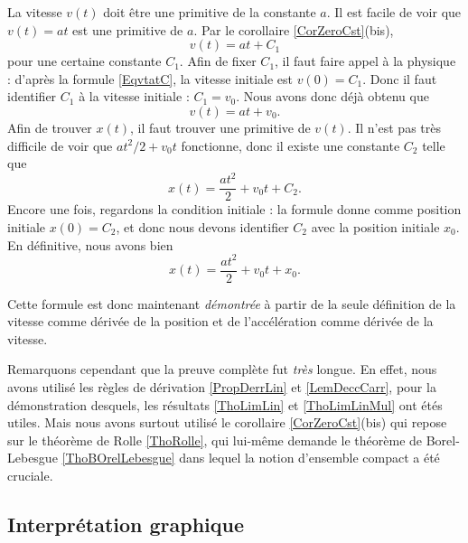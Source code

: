 La vitesse $v(t)$ doit être une primitive de la constante $a$. Il est facile de voir que $v(t)=at$ est une primitive de $a$. Par le corollaire \ref{CorZeroCst}(bis),
\begin{equation}    \label{EqvtatC}
    v(t)=at+C_1
\end{equation}
pour une certaine constante $C_1$. Afin de fixer $C_1$, il faut faire appel à la physique : d'après la formule \eqref{EqvtatC}, la vitesse initiale est $v(0)=C_1$. Donc il faut identifier $C_1$ à la vitesse initiale : $C_1=v_0$. Nous avons donc déjà obtenu que
\begin{equation}
    v(t)=at+v_0.
\end{equation}
Afin de trouver $x(t)$, il faut trouver une primitive de $v(t)$. Il n'est pas très difficile de voir que $at^2/2 + v_0t$ fonctionne, donc il existe une constante $C_2$ telle que
\begin{equation}
    x(t)=\frac{ at^2 }{ 2 }+v_0t+C_2.
\end{equation}
Encore une fois, regardons la condition initiale : la formule donne comme position initiale $x(0)=C_2$, et donc nous devons identifier $C_2$ avec la position initiale $x_0$. En définitive, nous avons bien
\begin{equation}
    x(t) = \frac{ at^2 }{ 2 } + v_0t +x_0.
\end{equation}

Cette formule est donc maintenant \emph{démontrée} à partir de la seule définition de la vitesse comme dérivée de la position et de l'accélération comme dérivée de la vitesse. 

Remarquons cependant que la preuve complète fut \emph{très} longue. En effet, nous avons utilisé les règles de dérivation 
\ref{PropDerrLin} et \ref{LemDeccCarr}, pour la démonstration desquels, les résultats \ref{ThoLimLin} et \ref{ThoLimLinMul} ont étés utiles. Mais nous avons surtout utilisé le corollaire \ref{CorZeroCst}(bis) qui repose sur le théorème de Rolle \ref{ThoRolle}, qui lui-même demande le théorème de Borel-Lebesgue \ref{ThoBOrelLebesgue} dans lequel la notion d'ensemble compact a été cruciale.

                    \subsection{Interprétation graphique}

